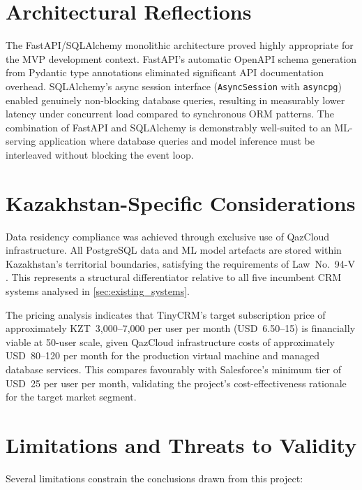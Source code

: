 \section{Architectural Reflections}

The FastAPI/SQLAlchemy monolithic architecture proved highly appropriate
for the MVP development context. FastAPI's automatic OpenAPI schema
generation from Pydantic type annotations eliminated significant API
documentation overhead. SQLAlchemy's async session interface
(\texttt{AsyncSession} with \texttt{asyncpg}) enabled genuinely
non-blocking database queries, resulting in measurably lower latency under
concurrent load compared to synchronous ORM patterns. The combination of
FastAPI and SQLAlchemy is demonstrably well-suited to an ML-serving
application where database queries and model inference must be interleaved
without blocking the event loop.

\section{Kazakhstan-Specific Considerations}

Data residency compliance was achieved through exclusive use of QazCloud
infrastructure. All PostgreSQL data and ML model artefacts are stored within 
Kazakhstan's territorial boundaries, satisfying the requirements of 
Law~No.~94-V \citep{kazakhstanlaw94v}. This represents a structural 
differentiator relative to all five incumbent CRM systems analysed in 
\cref{sec:existing_systems}.

The pricing analysis indicates that TinyCRM's target subscription price
of approximately KZT~3,000--7,000 per user per month (USD~6.50--15) is
financially viable at 50-user scale, given QazCloud infrastructure costs
of approximately USD~80--120 per month for the production virtual machine
and managed database services. This compares favourably with Salesforce's
minimum tier of USD~25 per user per month, validating the project's
cost-effectiveness rationale for the target market segment.

\section{Limitations and Threats to Validity}

Several limitations constrain the conclusions drawn from this project:

